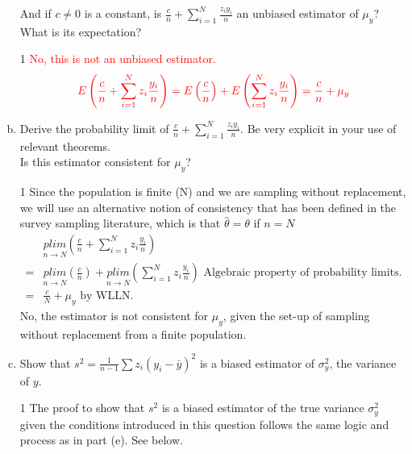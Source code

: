 \documentclass[12pt,letterpaper]{article}
\newcommand{\solutions}{0}
\begin{document}
\begin{enumerate}[(a)]
 And if $c\neq0$ is a constant, is $\frac{c}{n}+\sum_{i=1}^{N} \frac{z_i y_i}{n}$ an unbiased estimator of $\mu_y$? What is its expectation?
 
 \if\solutions1
\textcolor{red}{No, this is not an unbiased estimator.}
\begin{align*}
\textcolor{red}{E\left(\frac{c}{n}+\sum_{i=1}^N z_i \frac{y_i}{n}\right)=E\left(\frac{c}{n}\right)+E\left(\sum_{i=1}^N z_i \frac{y_i}{n}\right)=\frac{c}{n}+\mu_y}
\end{align*}
\fi
\item Derive the probability limit of $\frac{c}{n}+\sum_{i=1}^{N} \frac{z_i y_i}{n}$. Be very explicit in your use of relevant theorems. \\ Is this estimator consistent for $\mu_y$?

\if\solutions1
{\color{red}
Since the population is finite (N) and we are sampling without replacement, we will use an alternative notion of consistency that has been defined in the survey sampling literature, which is that $\hat{\theta} = \theta$ if $n=N$
\begin{align*}
&\underset{n\to N}{plim}\left(\frac{c}{n}+\sum_{i=1}^N z_i \frac{y_i}{n}\right) \\
=&\underset{n\to N}{plim}\left(\frac{c}{n}\right)+\underset{n\to N}{plim}\left(\sum_{i=1}^N z_i \frac{y_i}{n}\right) \text{ Algebraic property of probability limits.} \\
=& \frac{c}{N} +\mu_y \text{ by WLLN.}
\end{align*}
No, the estimator is not consistent for $\mu_y$, given the set-up of sampling without replacement from a finite population.
}
\fi

\item Show that $s^2=\frac{1}{n-1}\sum z_i(y_i-\bar{y})^2$ is a biased estimator of $\sigma^2_y$, the variance of $y$.

\if\solutions1
{\color{red}
The proof to show that $s^2$ is a biased estimator of the true variance $\sigma^2_y$ given the conditions introduced in this question follows the same logic and process as in part (e). See below.
}
\fi


\end{enumerate}
\end{document}
